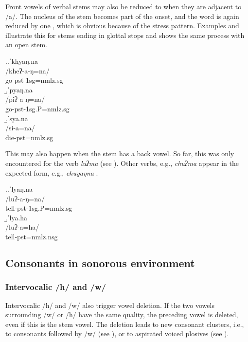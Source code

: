 Front vowels of verbal stems may also be reduced to  when they are adjacent to /a/. The  nucleus of the stem becomes part of the onset, and the word is again reduced by one , which is obvious because of the stress pattern. Examples \Next[a] and \Next[b] illustrate this for stems  ending in glottal stops and \Next[c] shows the same process with an open stem.


\ex.\a.\glll ˈkhyaŋ.na\\
/kheʔ-a-ŋ=na/\\
go{\sc -pst-1sg=nmlz.sg}\\
\b.\glll ˈpyaŋ.na\\
/piʔ-a-ŋ=na/\\
go{\sc [3sg.A]-pst-1sg.P=nmlz.sg}\\
\b.\glll  ˈsya.na\\
/si-a=na/\\
die{\sc [3sg]-pst=nmlz.sg}\\

This may also happen when the stem has a back vowel. So far, this was only encountered for the verb \emph{luʔma} (see \Next). Other verbs, e.g., \emph{chuʔma}  appear in the expected form, e.g.,  \emph{chuyaŋna} .

\ex.\a.\glll ˈlyaŋ.na\\
/luʔ-a-ŋ=na/\\
tell{\sc [3sg.A]-pst-1sg.P=nmlz.sg}\\
\b.\glll ˈlya.ha\\
/luʔ-a=ha/\\
tell{\sc [3sg.A;1.P]-pst=nmlz.nsg}\\


\subsection{Consonants in sonorous environment}\label{h-w-m}

\subsubsection{Intervocalic /h/ and /w/}
	
Intervocalic /h/ and /w/ also trigger vowel deletion. If the two vowels surrounding /w/ or /h/ have the same quality, the preceding vowel is deleted, even if this is the stem vowel. The deletion leads to new consonant clusters, i.e., to consonants followed by /w/ (see \Next[a]), or to aspirated voiced plosives (see \Next[b]). 
\largerpage

